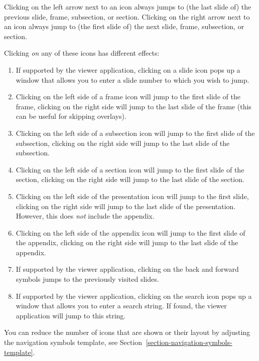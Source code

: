 Clicking on the left arrow next to an icon always jumps to (the
last slide of) the previous slide, frame, subsection, or
section. Clicking on the right arrow next to an icon always jump to
(the first slide of) the next slide, frame, subsection, or section. 

Clicking \emph{on} any of these icons has different effects:
\begin{enumerate}
\item
  If supported by the viewer application, clicking on a slide icon
  pops up a window that allows you to enter a slide number to which
  you wish to jump.
\item
  Clicking on the left side of a frame icon will jump to the first
  slide of the frame, clicking on the right side will jump to the last
  slide of the frame (this can be useful for skipping overlays).
\item
  Clicking on the left side of a subsection icon will jump to the
  first slide of the subsection, clicking on the right side will jump
  to the last slide of the subsection.
\item
  Clicking on the left side of a section icon will jump to the
  first slide of the section, clicking on the right side will jump
  to the last slide of the section.
\item
  Clicking on the left side of the presentation icon will jump to the
  first slide, clicking on the right side will jump to the last slide
  of the presentation. However, this does \emph{not} include the
  appendix. 
\item
  Clicking on the left side of the appendix icon will jump to the
  first slide of the appendix, clicking on the right side will jump to
  the last slide of the appendix.
\item
  If supported by the viewer application, clicking on the back and
  forward symbols jumps to the previously visited slides.
\item
  If supported by the viewer application, clicking on the search icon
  pops up a window that allows you to enter a search string. If found,
  the viewer application will jump to this string.
\end{enumerate}

You can reduce the number of icons that are shown or their layout by
adjusting the navigation symbols template, see
Section~\ref{section-navigation-symbols-template}. 







